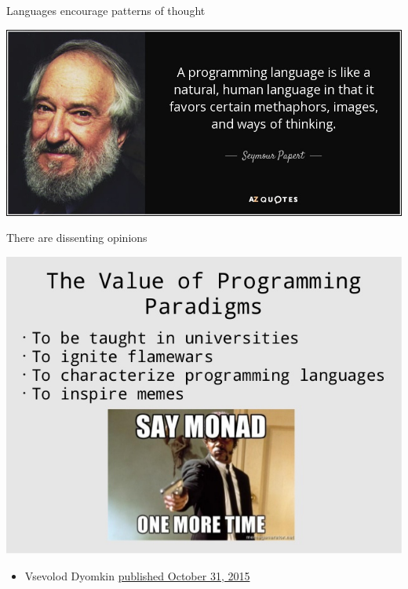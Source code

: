 \documentclass[presetation]{beamer}
\begin{document}
\begin{frame}[label={sec:orgbe15302}]{Languages encourage patterns of thought}
\begin{center}
\includegraphics[width=.9\linewidth]{./images/papert.jpeg}
\end{center}
\end{frame}

\begin{frame}[label={sec:orgd9453a6}]{There are dissenting opinions}
\begin{center}
\includegraphics[width=.9\linewidth]{./images/noVal.jpg}
\end{center}
\begin{itemize}
\item Vsevolod Dyomkin \href{https://www.slideshare.net/vseloved/can-functional-programming-be-liberated-from-static-typing}{published October 31, 2015}
\end{itemize}
\end{frame}
\end{document}
